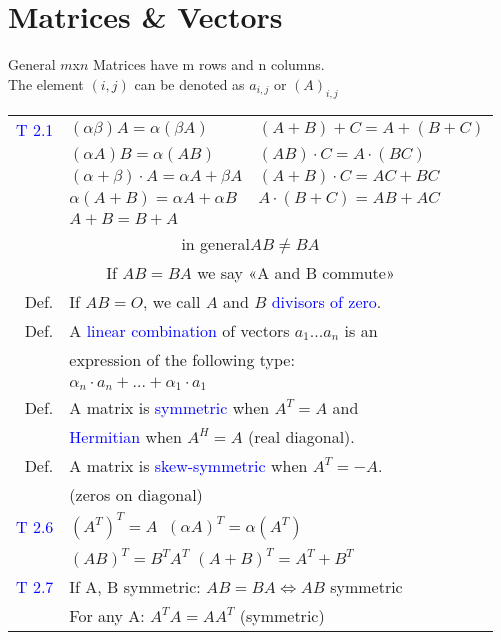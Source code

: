 \section{Matrices \& Vectors}
\begin{mainbox}{General}
$m$x$n$ Matrices have m rows and n columns.\\
The element $(i,j)$ can be denoted as $a_{i,j}$ or $(A)_{i,j}$
\smallskip\\
\setlength{\tabcolsep}{2pt}
\begin{tabular}{rll}
	\textcolor{blue}{T 2.1} & \multicolumn{1}{l|}{$(\alpha\beta)A = \alpha(\beta A)$} & $(A+B)+C = A+(B+C)$ \\
	& \multicolumn{1}{l|}{$(\alpha A)B = \alpha(AB)$} & $(AB)\cdot C = A\cdot (BC)$ \\
	& \multicolumn{1}{l|}{$(\alpha + \beta)\cdot A = \alpha A + \beta A$} & $(A+B)\cdot C = AC + BC$ \\
	& \multicolumn{1}{l|}{$\alpha (A+B) = \alpha A + \alpha B$} & $A\cdot (B+C) = AB+AC$ \\
	& \multicolumn{1}{l|}{$A+B = B+A$} & \\
	\multicolumn{3}{c}{\warning in general$AB \neq BA$}\\ %
	\multicolumn{3}{c}{If $AB = BA$ we say «A and B commute»}\\
	\rule{0pt}{3ex}
	Def. & \multicolumn{2}{l}{If $AB = O$, we call $A$ and $B$ \textcolor{blue}{divisors of zero}.}\\
	\rule{0pt}{3ex}
	Def. & \multicolumn{2}{l}{A \textcolor{blue}{linear combination} of vectors $a_1 ... a_n$ is an}\\
 	& \multicolumn{2}{l}{expression of the following type:}\\
 	& \multicolumn{2}{l}{$\alpha_n\cdot a_n + ... + \alpha_1\cdot a_1$}\\
 	\rule{0pt}{3ex}
	Def. & \multicolumn{2}{l}{A matrix is \textcolor{blue}{symmetric} when $A^T = A$ and}\\
	& \multicolumn{2}{l}{\textcolor{blue}{Hermitian} when $A^H = A$ (real diagonal).}\\
	\rule{0pt}{3ex}
	Def. & \multicolumn{2}{l}{A matrix is \textcolor{blue}{skew-symmetric} when $A^T = -A$.}\\
	& \multicolumn{2}{l}{(zeros on diagonal)}\\
	\rule{0pt}{3ex}
	\textcolor{blue}{T 2.6} & \multicolumn{2}{l}{$(A^T)^T = A$ \qquad\qquad $\:(\alpha A)^T = \alpha(A^T)$}\\
	& \multicolumn{2}{l}{$(AB)^T = B^TA^T$ \qquad $(A+B)^T = A^T + B^T$}\\
	\rule{0pt}{3ex}
	\textcolor{blue}{T 2.7} & \multicolumn{2}{l}{If A, B symmetric: $AB = BA \Leftrightarrow AB$ symmetric}\\
	& \multicolumn{2}{l}{For any A: $A^TA = AA^T$ (symmetric)}\\
\end{tabular}
\end{mainbox}

